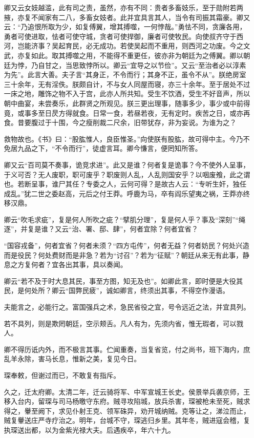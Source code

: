 \documentclass[12pt,UTF8]{ctexbook}
\begin{document}
卿又云女妓越滥，此有司之责，虽然，亦有不同：贵者多畜妓乐，至于勋附若两掖，亦复不闻家有二八，多畜女妓者。此并宜具言其人，当令有司振其霜豪。卿又云：“乃追恨所取为少，如复傅翼，增其搏噬，一何悖哉。”勇怯不同，贪廉各用，勇者可使进取，怯者可使守城，贪者可使捍御，廉者可使牧民。向使叔齐守于西河，岂能济事？吴起育民，必无成功。若使吴起而不重用，则西河之功废。今之文武，亦复如此。取其搏噬之用，不能得不重更任，彼亦非为朝廷为之傅翼。卿以朝廷为悖，乃自甘之，当思致悖所以。卿云“宜导之以节俭”。又云“至治者必以淳素为先”。此言大善。夫子言“其身正，不令而行；其身不正，虽令不从”。朕绝房室三十余年，无有淫佚。朕颇自计，不与女人同屋而寝，亦三十余年。至于居处不过一床之地，雕饰之物不入于宫，此亦人所共知。受生不饮酒，受生不好音声，所以朝中曲宴，未尝奏乐，此群贤之所观见。朕三更出理事，随事多少，事少或中前得竟，或事多至日昃方得就食。日常一食，若昼若夜，无有定时。疾苦之日，或亦再食。昔要腹过于十围，今之瘦削裁二尺余，旧带犹存，非为妄说。为谁为之？

救物故也。《书》曰：“股肱惟人，良臣惟圣。”向使朕有股肱，故可得中主。今乃不免居九品之下，“不令而行”，徒虚言耳。卿今慊言，便罔知所答。

卿又云“百司莫不奏事，诡竞求进”。此又是谁？何者复是诡事？今不使外人呈事，于义可否？无人废职，职可废乎？职废则人乱，人乱则国安乎？以咽废飧，此之谓也。若断呈事，谁尸其任？专委之人，云何可得？是故古人云：“专听生奸，独任成乱。”犹二世之委赵高，元后之付王莽。呼鹿为马，卒有阎乐望夷之祸，王莽亦终移汉鼎。

卿云“吹毛求疵”，复是何人所吹之疵？“擘肌分理”，复是何人乎？事及“深刻”“绳逐”，并复是谁？又云“治、署、邸、肆”，何者宜除？何者宜省？

“国容戎备”，何者宜省？何者未须？“四方屯传”，何者无益？何者妨民？何处兴造而是役民？何处费财而是非急？若为“讨召”？若为“征赋”？朝廷从来无有此事，静息之方复何者？宜各出其事，具以奏闻。

卿云“若不及于时大息其民，事至方图，知无及也”。如卿此言，即时便是大役其民，是何处所？卿云“国弊民疲”，诚如卿言，终须出其事，不得空作漫语。

夫能言之，必能行之。富国强兵之术，急民省役之宜，号令远近之法，并宜具列。

若不具列，则是欺罔朝廷，空示颊舌。凡人有为，先须内省，惟无瑕者，可以戮人。

卿不得历诋内外，而不极言其事。伫闻重奏，当复省览，付之尚书，班下海内，庶乱羊永除，害马长息，惟新之美，复见今日。

琛奉敕，但谢过而已，不敢复有指斥。

久之，迁太府卿。太清二年，迁云骑将军、中军宣城王长史。侯景举兵袭京师，王移入台内，留琛与司马杨曒守东府。贼寻攻陷城，放兵杀害，琛被枪未至死，贼求得之，轝至阙下，求见仆射王克、领军硃异，劝开城纳贼。克等让之，涕泣而止，贼复轝送庄严寺疗治之。明年，台城不守，琛逃归乡里。其年冬，贼进寇会稽，复执琛送出都，以为金紫光禄大夫。后遇疾卒，年六十九。
\end{document}
